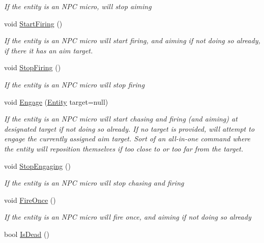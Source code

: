 \begin{DoxyCompactItemize}
\begin{DoxyCompactList}\small\item\em If the entity is an N\+PC micro, will stop aiming \end{DoxyCompactList}\item 
void \mbox{\hyperlink{class_lua_1_1_entity_a3a5c197d31f8834f8ed67f71c6157719}{Start\+Firing}} ()
\begin{DoxyCompactList}\small\item\em If the entity is an N\+PC micro will start firing, and aiming if not doing so already, if there it has an aim target. \end{DoxyCompactList}\item 
void \mbox{\hyperlink{class_lua_1_1_entity_a4d7809fc03b618624a6d7640674fe646}{Stop\+Firing}} ()
\begin{DoxyCompactList}\small\item\em If the entity is an N\+PC micro will stop firing \end{DoxyCompactList}\item 
void \mbox{\hyperlink{class_lua_1_1_entity_af23f0b36c1b4c778fc7f328490223852}{Engage}} (\mbox{\hyperlink{class_lua_1_1_entity}{Entity}} target=null)
\begin{DoxyCompactList}\small\item\em If the entity is an N\+PC micro will start chasing and firing (and aiming) at designated target if not doing so already. If no target is provided, will attempt to engage the currently assigned aim target. Sort of an all-\/in-\/one command where the entity will reposition themselves if too close to or too far from the target. \end{DoxyCompactList}\item 
void \mbox{\hyperlink{class_lua_1_1_entity_a9ead5c7d5e821fa285ab065b9cc3185f}{Stop\+Engaging}} ()
\begin{DoxyCompactList}\small\item\em If the entity is an N\+PC micro will stop chasing and firing \end{DoxyCompactList}\item 
void \mbox{\hyperlink{class_lua_1_1_entity_a17d117771166d30924da118c1fed9968}{Fire\+Once}} ()
\begin{DoxyCompactList}\small\item\em If the entity is an N\+PC micro will fire once, and aiming if not doing so already \end{DoxyCompactList}\item 
bool \mbox{\hyperlink{class_lua_1_1_entity_a6357c0a54e9aa79beb928d079b42aa76}{Is\+Dead}} ()

\end{DoxyCompactItemize}
